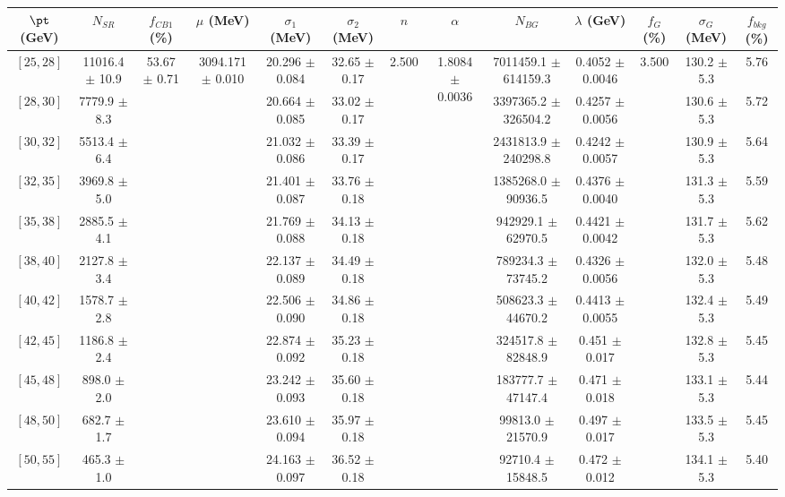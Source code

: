 \begin{tabular}{c||c|c|c|c|c|c|c|c|c|c|c||c}
$\pt$ (GeV) & $N_{SR}$ & $f_{CB1}$ (\%) & $\mu$ (MeV) & $\sigma_1$ (MeV) & $\sigma_2$ (MeV) & $n$ & $\alpha$ & $N_{BG}$ & $\lambda$ (GeV) & $f_G$ (\%) & $\sigma_G$ (MeV) & $f_{bkg}$ (\%) \\
\hline
$[25, 28]$ & 11016.4 $\pm$ 10.9 & \multirow{19}{*}{53.67 $\pm$ 0.71} & \multirow{19}{*}{3094.171 $\pm$ 0.010} & 20.296 $\pm$ 0.084 & 32.65 $\pm$ 0.17 & \multirow{19}{*}{2.500} & \multirow{19}{*}{1.8084 $\pm$ 0.0036} & 7011459.1 $\pm$ 614159.3 & 0.4052 $\pm$ 0.0046 & \multirow{19}{*}{3.500} & 130.2 $\pm$ 5.3 & 5.76\\
$[28, 30]$ & 7779.9 $\pm$ 8.3 &  &  & 20.664 $\pm$ 0.085 & 33.02 $\pm$ 0.17 &  &  & 3397365.2 $\pm$ 326504.2 & 0.4257 $\pm$ 0.0056 &  & 130.6 $\pm$ 5.3 & 5.72\\
$[30, 32]$ & 5513.4 $\pm$ 6.4 &  &  & 21.032 $\pm$ 0.086 & 33.39 $\pm$ 0.17 &  &  & 2431813.9 $\pm$ 240298.8 & 0.4242 $\pm$ 0.0057 &  & 130.9 $\pm$ 5.3 & 5.64\\
$[32, 35]$ & 3969.8 $\pm$ 5.0 &  &  & 21.401 $\pm$ 0.087 & 33.76 $\pm$ 0.18 &  &  & 1385268.0 $\pm$ 90936.5 & 0.4376 $\pm$ 0.0040 &  & 131.3 $\pm$ 5.3 & 5.59\\
$[35, 38]$ & 2885.5 $\pm$ 4.1 &  &  & 21.769 $\pm$ 0.088 & 34.13 $\pm$ 0.18 &  &  & 942929.1 $\pm$ 62970.5 & 0.4421 $\pm$ 0.0042 &  & 131.7 $\pm$ 5.3 & 5.62\\
$[38, 40]$ & 2127.8 $\pm$ 3.4 &  &  & 22.137 $\pm$ 0.089 & 34.49 $\pm$ 0.18 &  &  & 789234.3 $\pm$ 73745.2 & 0.4326 $\pm$ 0.0056 &  & 132.0 $\pm$ 5.3 & 5.48\\
$[40, 42]$ & 1578.7 $\pm$ 2.8 &  &  & 22.506 $\pm$ 0.090 & 34.86 $\pm$ 0.18 &  &  & 508623.3 $\pm$ 44670.2 & 0.4413 $\pm$ 0.0055 &  & 132.4 $\pm$ 5.3 & 5.49\\
$[42, 45]$ & 1186.8 $\pm$ 2.4 &  &  & 22.874 $\pm$ 0.092 & 35.23 $\pm$ 0.18 &  &  & 324517.8 $\pm$ 82848.9 & 0.451 $\pm$ 0.017 &  & 132.8 $\pm$ 5.3 & 5.45\\
$[45, 48]$ & 898.0 $\pm$ 2.0 &  &  & 23.242 $\pm$ 0.093 & 35.60 $\pm$ 0.18 &  &  & 183777.7 $\pm$ 47147.4 & 0.471 $\pm$ 0.018 &  & 133.1 $\pm$ 5.3 & 5.44\\
$[48, 50]$ & 682.7 $\pm$ 1.7 &  &  & 23.610 $\pm$ 0.094 & 35.97 $\pm$ 0.18 &  &  & 99813.0 $\pm$ 21570.9 & 0.497 $\pm$ 0.017 &  & 133.5 $\pm$ 5.3 & 5.45\\
$[50, 55]$ & 465.3 $\pm$ 1.0 &  &  & 24.163 $\pm$ 0.097 & 36.52 $\pm$ 0.18 &  &  & 92710.4 $\pm$ 15848.5 & 0.472 $\pm$ 0.012 &  & 134.1 $\pm$ 5.3 & 5.40\\

\end{tabular}
